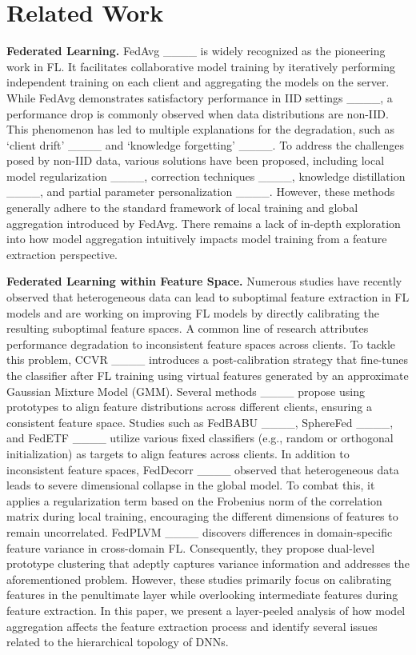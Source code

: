 \section{Related Work}
\textbf{Federated Learning.} 
FedAvg ____ is widely recognized as the pioneering work in FL. It facilitates collaborative model training by iteratively performing independent training on each client and aggregating the models on the server. While FedAvg demonstrates satisfactory performance in IID settings ____, a performance drop is commonly observed when data distributions are non-IID. This phenomenon has led to multiple explanations for the degradation, such as `client drift' ____ and `knowledge forgetting' ____.
To address the challenges posed by non-IID data, various solutions have been proposed, including local model regularization ____, correction techniques ____, knowledge distillation ____, and partial parameter personalization ____. However, these methods generally adhere to the standard framework of local training and global aggregation introduced by FedAvg. There remains a lack of in-depth exploration into how model aggregation intuitively impacts model training from a feature extraction perspective.

\textbf{Federated Learning within Feature Space.} 
Numerous studies have recently observed that heterogeneous data can lead to suboptimal feature extraction in FL models and are working on improving FL models by directly calibrating the resulting suboptimal feature spaces. 
A common line of research attributes performance degradation to inconsistent feature spaces across clients. 
To tackle this problem, CCVR ____ introduces a post-calibration strategy that fine-tunes the classifier after FL training using virtual features generated by an approximate Gaussian Mixture Model (GMM).
Several methods ____ propose using prototypes to align feature distributions across different clients, ensuring a consistent feature space. Studies such as FedBABU ____, SphereFed ____, and FedETF ____ utilize various fixed classifiers (e.g., random or orthogonal initialization) as targets to align features across clients.
In addition to inconsistent feature spaces, FedDecorr ____ observed that heterogeneous data leads to severe dimensional collapse in the global model. 
To combat this, it applies a regularization term based on the Frobenius norm of the correlation matrix during local training, encouraging the different dimensions of features to remain uncorrelated. 
FedPLVM ____ discovers differences in domain-specific feature variance in cross-domain FL. 
Consequently, they propose dual-level prototype clustering that adeptly captures variance information and addresses the aforementioned problem.
However, these studies primarily focus on calibrating features in the penultimate layer while overlooking intermediate features during feature extraction.
In this paper, we present a layer-peeled analysis of how model aggregation affects the feature extraction process and identify several issues related to the hierarchical topology of DNNs.

